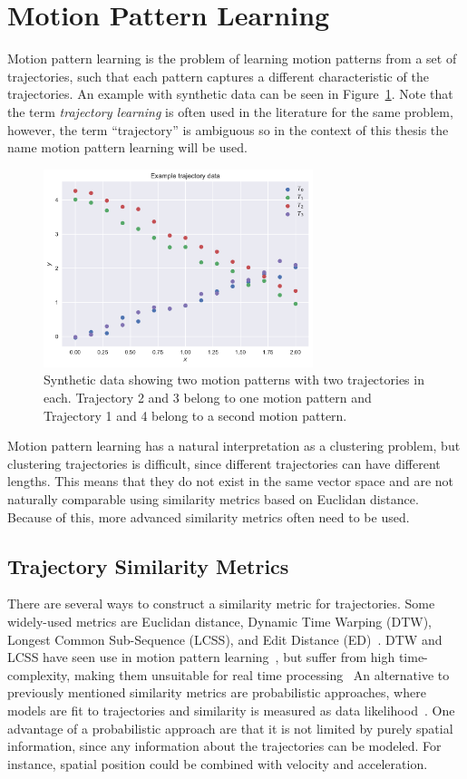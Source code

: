 \section{Motion Pattern Learning}
Motion pattern learning is the problem of learning motion patterns from a
set of trajectories, such that each pattern captures a different
characteristic of the trajectories. An example with synthetic data can be
seen in Figure~\ref{fig:motion-pattern-example}. Note that the term
\textit{trajectory learning} is often used in the literature for the
same problem, however, the term ``trajectory'' is ambiguous so in the
context of this thesis the name motion pattern learning will be used. 
\begin{figure}[H]
  \centering
  \includegraphics[width=0.7\textwidth]{figures/motion-pattern-example}
  \caption{Synthetic data showing two motion patterns with two trajectories in
    each. Trajectory 2 and 3 belong to one motion pattern and
    Trajectory 1 and 4 belong to a second motion pattern.}\label{fig:motion-pattern-example}
\end{figure}
Motion pattern learning has a natural interpretation as a
clustering problem, but clustering trajectories is difficult,
since different trajectories can have different lengths.
This means that they do not exist in the same vector space and are not
naturally comparable using similarity metrics based on Euclidan
distance. Because of this, more advanced similarity metrics often need to be used. 

\subsection{Trajectory Similarity Metrics}
There are several ways to construct a similarity metric for
trajectories. Some widely-used metrics are Euclidan distance,
Dynamic Time Warping (DTW), Longest Common Sub-Sequence (LCSS), and Edit
Distance (ED)~\cite{Wang2013Jan}. DTW and LCSS have seen use in
motion pattern learning~\cite{Tang2018Aug, Vlachos2002Feb}, but suffer
from high time-complexity, making them unsuitable for real time processing~\cite{Zhang2006Aug}
An alternative to previously mentioned similarity metrics are probabilistic
approaches, where models are fit to trajectories
and similarity is measured as data likelihood~\cite{Kim2011Nov, Tran2014Jun, Tiger2015Jul}.
One advantage of a probabilistic approach are that it is not limited by
purely spatial information, since any information about the trajectories can
be modeled. For instance, spatial position could be combined
with velocity and acceleration.

